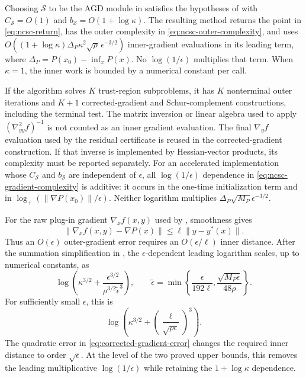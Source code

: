 \documentclass{article}
\begin{document}
\begin{corollary}
\label{cor:ncsc-agd-realization}
Choosing $\mathcal S$ to be the AGD module in
 satisfies the hypotheses of
 with
$C_{\mathcal S}=O(1)$ and
$b_{\mathcal S}=O(1+\log\kappa)$.  The resulting method returns the
point in \eqref{eq:ncsc-return}, has the outer complexity in
\eqref{eq:ncsc-outer-complexity}, and uses
$O((1+\log\kappa)\Delta_P\kappa^2\sqrt\rho\,\epsilon^{-3/2})$
inner-gradient evaluations in its leading term, where
$\Delta_P=P(x_0)-\inf_xP(x)$.  No
$\log(1/\epsilon)$ multiplies that term.  When $\kappa=1$, the inner
work is bounded by a numerical constant per call.
\end{corollary}

\begin{remark}
If the algorithm solves $K$ trust-region subproblems, it has $K$
nonterminal outer iterations and $K+1$ corrected-gradient and
Schur-complement constructions, including the terminal test.  The matrix
inversion or
linear algebra used to apply
$(\nabla^2_{yy}f)^{-1}$ is not counted as an inner gradient evaluation.
The final $\nabla_y f$ evaluation used by the residual certificate is
reused in the corrected-gradient construction.
If that inverse is implemented by Hessian-vector products, its complexity
must be reported separately.  For an accelerated implementation whose
$C_{\mathcal S}$ and $b_{\mathcal S}$ are independent of $\epsilon$,
all $\log(1/\epsilon)$ dependence in
\eqref{eq:ncsc-gradient-complexity} is additive: it occurs in the
one-time initialization term and in
$\log_+(\|\nabla P(x_0)\|/\epsilon)$.  Neither
logarithm multiplies $\Delta_P\sqrt{M_P}\epsilon^{-3/2}$.
\end{remark}

\begin{remark}
For the raw plug-in gradient $\nabla_xf(x,y)$ used by
\citet{luo2022finding}, smoothness gives
\[
 \|\nabla_xf(x,y)-\nabla P(x)\|
 \le\ell\|y-y^*(x)\|.
\]
Thus an $O(\epsilon)$ outer-gradient error requires an
$O(\epsilon/\ell)$ inner distance.  After the summation simplification
in \citet[Theorem~2]{luo2022finding}, the $\epsilon$-dependent leading
logarithm scales, up to numerical constants, as
\[
 \log\!\left(
  \kappa^{3/2}
  +\frac{\epsilon^{3/2}}
   {\rho^{3/2}\widetilde\epsilon^3}
 \right),
 \qquad
 \widetilde\epsilon
 =\min\left\{\frac{\epsilon}{192\ell},
  \frac{\sqrt{M_P\epsilon}}{48\rho}\right\}.
\]
For sufficiently small $\epsilon$, this is
\[
 \log\!\left(
  \kappa^{3/2}
  +\left(\frac{\ell}{\sqrt{\rho\epsilon}}\right)^3
 \right).
\]
The quadratic error in \eqref{eq:corrected-gradient-error} changes the
required inner distance to order $\sqrt\epsilon$.  At the level of the
two proved upper bounds, this removes the leading multiplicative
$\log(1/\epsilon)$ while retaining the $1+\log\kappa$ dependence.
\end{remark}
\end{document}
